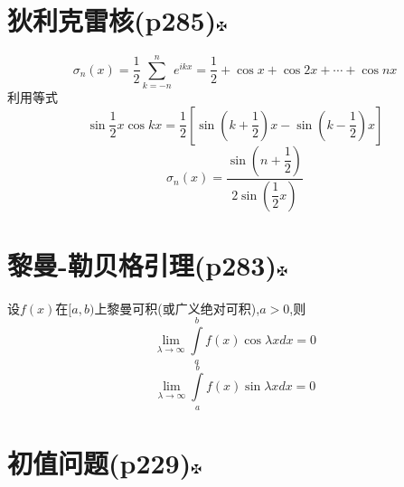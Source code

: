 \documentclass[11pt, a4paper, UTF8]{ctexart}
\begin{document}
\section{狄利克雷核(p285)\protect\hyperlink{catalog}{$\fuck$}}
$$\sigma_n(x)=\dfrac{1}{2}\sum_{k=-n}^{n}e^{ikx}=\dfrac{1}{2}+\cos x+\cos 2x+\cdots+\cos nx$$
利用等式\\
$$\sin\dfrac{1}{2}x\cos kx=\dfrac{1}{2}[\sin(k+\dfrac{1}{2})x-\sin(k-\dfrac{1}{2})x]$$
$$\sigma_n(x)=\dfrac{\sin(n+\dfrac{1}{2})}{2\sin(\dfrac{1}{2}x)}$$
\section{黎曼-勒贝格引理(p283)\protect\hyperlink{catalog}{$\fuck$}}
设$f(x)$在$[a,b)$上黎曼可积(或广义绝对可积),$a>0$,则\\
$$\lim\limits_{\lambda\to\infty}\int\limits_a^bf(x)\cos\lambda xdx=0$$
$$\lim\limits_{\lambda\to\infty}\int\limits_a^bf(x)\sin\lambda xdx=0$$
\section{初值问题(p229)\protect\hyperlink{catalog}{$\fuck$}}
\end{document}
